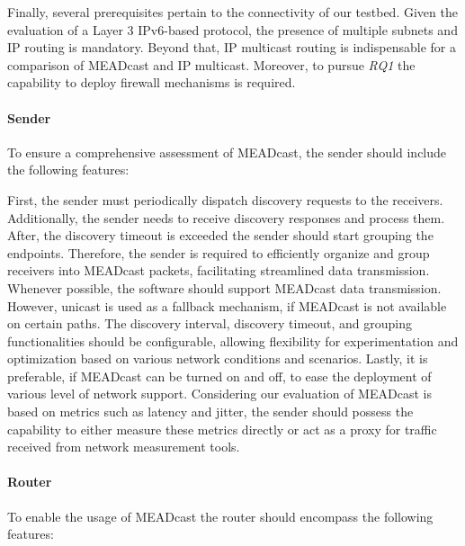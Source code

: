 Finally, several prerequisites pertain to the connectivity of our testbed.
Given the evaluation of a Layer 3 IPv6-based protocol, the presence of multiple
    subnets and IP routing is mandatory.
Beyond that, IP multicast routing is indispensable for a comparison of MEADcast
    and IP multicast.
Moreover, to pursue \textit{RQ1} the capability to deploy firewall mechanisms
    is required.

\paragraph{Sender} %
\label{par:Sender}
To ensure a comprehensive assessment of MEADcast, the sender should include the
    following features:

First, the sender must periodically dispatch discovery requests to the
    receivers.
Additionally, the sender needs to receive discovery responses and process them.
After, the discovery timeout is exceeded the sender should start grouping the
    endpoints.
Therefore, the sender is required to efficiently organize and group receivers
    into MEADcast packets, facilitating streamlined data transmission.
Whenever possible, the software should support MEADcast data transmission.
However, unicast is used as a fallback mechanism, if MEADcast is not available
    on certain paths.
The discovery interval, discovery timeout, and grouping functionalities should
    be configurable, allowing flexibility for experimentation and optimization
    based on various network conditions and scenarios.
Lastly, it is preferable, if MEADcast can be turned on and off, to ease the
    deployment of various level of network support.
Considering our evaluation of MEADcast is based on metrics such as latency and
    jitter, the sender should possess the capability to either measure these
    metrics directly or act as a proxy for traffic received from network
    measurement tools.

\paragraph{Router} %
\label{par:Router}
To enable the usage of MEADcast the router should encompass the following
    features:

